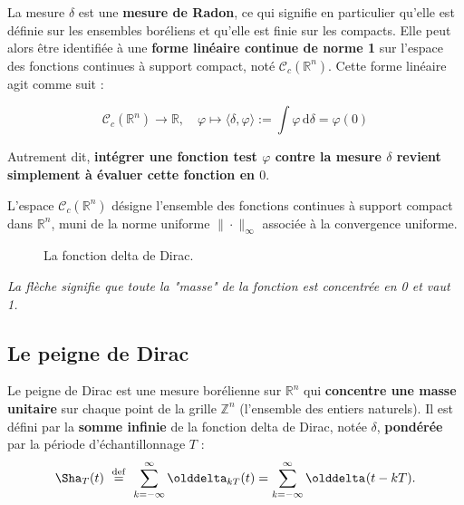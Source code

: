 La mesure $\delta$ est une \textbf{mesure de Radon}, ce qui signifie en 
particulier qu’elle est définie sur les ensembles boréliens et qu’elle est finie 
sur les compacts. Elle peut alors être identifiée à une 
\textbf{forme linéaire continue de norme 1} sur l’espace des fonctions continues 
à support compact, noté $\mathcal{C}_c(\mathbb{R}^n)$. Cette forme linéaire agit 
comme suit :

\[
\mathcal{C}_c(\mathbb{R}^n) \to \mathbb{R}, \quad \varphi \mapsto \langle \delta, \varphi \rangle := \int \varphi \, \mathrm{d}\delta = \varphi(0)
\]

Autrement dit, \textbf{intégrer une fonction test $\varphi$ contre la mesure 
$\delta$ revient simplement à évaluer cette fonction en $0$}.

L’espace $\mathcal{C}_c(\mathbb{R}^n)$ désigne l’ensemble des fonctions 
continues à support compact dans $\mathbb{R}^n$, muni de la norme uniforme 
$\|\cdot\|_\infty$ associée à la convergence uniforme.

\begin{figure}[!ht]
    \centering
    \caption{La fonction delta de Dirac.}
    \label{figDirac}%
\end{figure}

\emph{ La flèche signifie que toute la "masse" de la fonction est concentrée en 0 et vaut 1.}


\subsection{Le peigne de Dirac}
\label{sec:peigne-dirac}
Le peigne de Dirac est une mesure borélienne sur $\mathbb{R}^n$ qui
\textbf{concentre une masse unitaire} sur chaque point de la grille
\(\mathbb{Z}^n\) (l’ensemble des entiers naturels). Il est défini par la
\textbf{somme infinie} de la fonction delta de Dirac, notée $\delta$,
\textbf{pondérée} par la période d’échantillonnage $T$ :
\[
    \Sha_T (t)\ \stackrel{\mathrm{def}}{=}\  \sum_{k=-\infty}^{\infty}\delta_{k T}(t) = \sum_{k=-\infty}^{\infty}\delta(t-kT).
\]

